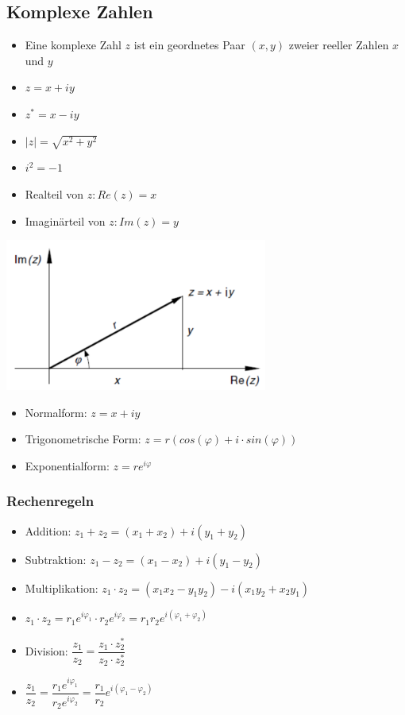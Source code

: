 \documentclass[8pt,a4paper]{scrartcl}
\begin{document}
\begin{multicols*}{3}
				
		
		\subsection{Komplexe Zahlen}
			\begin{itemize}\itemsep0pt	
				\item Eine komplexe Zahl $z$ ist ein geordnetes Paar $(x, y)$ zweier reeller Zahlen $x$ und $y$
				\item $z = x + iy$
				\item $z^{*} = x - iy$
				\item $|z|= \sqrt{x^{2}+y^{2}}$
				\item $i^{2} = -1$
				\item Realteil von $z: Re(z) = x$
				\item Imaginärteil von $z: Im(z) = y$
			\end{itemize}
			
			\includegraphics[height=5cm]{./img/komplex.png}
			
			\begin{itemize}\itemsep0pt	
				\item Normalform: $z = x + iy$
				\item Trigonometrische Form: $z = r(cos(\varphi)+i\cdot sin(\varphi))$
				\item Exponentialform: $z = re^{i\varphi}$
			\end{itemize}
			
			\subsubsection{Rechenregeln}
				\begin{itemize}\itemsep0pt	
					\item Addition: $z_{1} + z_{2} = (x_{1} + x_{2})+i(y_{1} + y_{2})$
					\item Subtraktion: $z_{1} - z_{2} = (x_{1} - x_{2})+i(y_{1} - y_{2})$
					\item Multiplikation: $z_{1} \cdot z_{2} = (x_{1}x_{2} - y_{1}y_{2}) - i(x_{1}y_{2} + x_{2}y_{1})$
					\item$z_{1} \cdot z_{2} =  r_{1}e^{i\varphi_{1}} \cdot  r_{2}e^{i\varphi_{2}} =  r_{1}r_{2}e^{i(\varphi_{1}+\varphi_{2})}$
					\item Division: $\dfrac{z_{1}}{z_{2}} = \dfrac{z_{1} \cdot z_{2}^{*} }{z_{2} \cdot z_{2}^{*} }$
					\item$\dfrac{z_{1}}{z_{2}} = \dfrac{r_{1}e^{i\varphi_{1}}}{r_{2}e^{i\varphi_{2}}} = \dfrac{r_{1}}{r_{2}}e^{i(\varphi_{1} - \varphi_{2})}$
				\end{itemize}
				

\end{multicols*}
\end{document}
